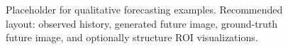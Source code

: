\begin{figure}[ht]
\centering
\fbox{\rule{0pt}{1.8in}\rule{0.9\linewidth}{0pt}}
\caption{Placeholder for qualitative forecasting examples. Recommended layout: observed history, generated future image, ground-truth future image, and optionally structure ROI visualizations.}
\label{fig:qualitative}
\end{figure}
